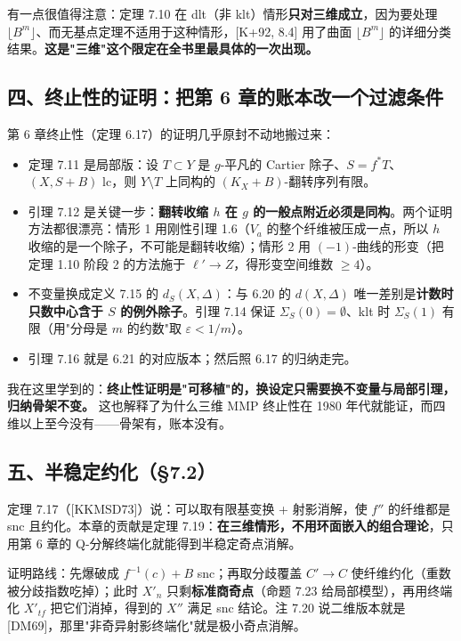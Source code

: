 有一点很值得注意：定理 7.10 在 dlt（非 klt）情形\textbf{只对三维成立}，因为要处理 $\lfloor B^m\rfloor$、而无基点定理不适用于这种情形，[K+92, 8.4] 用了曲面 $\lfloor B^m\rfloor$ 的详细分类结果。\textbf{这是"三维"这个限定在全书里最具体的一次出现。}

\subsection*{四、终止性的证明：把第 6 章的账本改一个过滤条件}

第 6 章终止性（定理 6.17）的证明几乎原封不动地搬过来：

\begin{itemize}
\item 定理 7.11 是局部版：设 $T\subset Y$ 是 $g$-平凡的 Cartier 除子、$S=f^*T$、$(X,S+B)$ lc，则 $Y\setminus T$ 上同构的 $(K_X+B)$-翻转序列有限。
\item 引理 7.12 是关键一步：\textbf{翻转收缩 $h$ 在 $g$ 的一般点附近必须是同构}。两个证明方法都很漂亮：情形 1 用刚性引理 1.6（$V_a$ 的整个纤维被压成一点，所以 $h$ 收缩的是一个除子，不可能是翻转收缩）；情形 2 用 $(-1)$-曲线的形变（把定理 1.10 阶段 2 的方法施于 $\ell'\to Z$，得形变空间维数 $\ge4$）。
\item 不变量换成定义 7.15 的 $d_S(X,\Delta)$：与 6.20 的 $d(X,\Delta)$ 唯一差别是\textbf{计数时只数中心含于 $S$ 的例外除子}。引理 7.14 保证 $\Sigma_S(0)=\emptyset$、klt 时 $\Sigma_S(1)$ 有限（用"分母是 $m$ 的约数"取 $\varepsilon<1/m$）。
\item 引理 7.16 就是 6.21 的对应版本；然后照 6.17 的归纳走完。
\end{itemize}

我在这里学到的：\textbf{终止性证明是"可移植"的，换设定只需要换不变量与局部引理，归纳骨架不变。} 这也解释了为什么三维 MMP 终止性在 1980 年代就能证，而四维以上至今没有——骨架有，账本没有。

\subsection*{五、半稳定约化（\S7.2）}

定理 7.17（[KKMSD73]）说：可以取有限基变换 + 射影消解，使 $f''$ 的纤维都是 snc 且约化。本章的贡献是定理 7.19：\textbf{在三维情形，不用环面嵌入的组合理论}，只用第 6 章的 Q-分解终端化就能得到半稳定奇点消解。

证明路线：先爆破成 $f^{-1}(c)+B$ snc；再取分歧覆盖 $C'\to C$ 使纤维约化（重数被分歧指数吃掉）；此时 $X'_n$ 只剩\textbf{标准商奇点}（命题 7.23 给局部模型），再用终端化 $X'_{tf}$ 把它们消掉，得到的 $X''$ 满足 snc 结论。注 7.20 说二维版本就是 [DM69]，那里"非奇异射影终端化"就是极小奇点消解。

